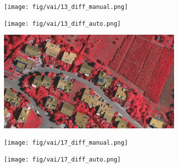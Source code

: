 \begin{figure}[H]
\begin{subfigure}{0.325\columnwidth}
\end{subfigure}\vspace{1mm}
\begin{subfigure}{0.325\columnwidth}
  \centering
  \texttt{[image: fig/vai/13\_diff\_manual.png]}
\end{subfigure}
\begin{subfigure}{0.325\columnwidth}
  \centering
  \texttt{[image: fig/vai/13\_diff\_auto.png]}
\end{subfigure}
\begin{subfigure}{0.325\columnwidth}
  \centering
  \includegraphics[angle=90,width=1\linewidth]{fig/vai/17.JPG} 
\end{subfigure}\vspace{1mm}
\begin{subfigure}{0.325\columnwidth}
  \centering
  \texttt{[image: fig/vai/17\_diff\_manual.png]}
\end{subfigure}
\begin{subfigure}{0.325\columnwidth}
  \centering
  \texttt{[image: fig/vai/17\_diff\_auto.png]}
\end{subfigure}
\begin{subfigure}{0.325\columnwidth}
  \centering

\end{subfigure}
\end{figure}
